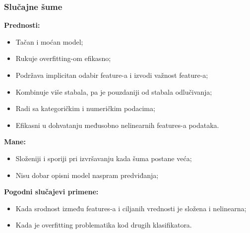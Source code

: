\documentclass[fontsize=12bp, paper=a4]{scrarticle}
\begin{document}
\subsubsection{Slučajne šume}
\textbf{Prednosti:}
\begin{itemize}
    \item Tačan i moćan model;
    \item Rukuje overfitting-om efikasno;
    \item Podržava implicitan odabir feature-a i izvodi važnost feature-a;
    \item Kombinuje više stabala, pa je pouzdaniji od stabala odlučivanja;
    \item Radi sa kategoričkim i numeričkim podacima;
    \item Efikasni u dohvatanju međusobno nelinearnih features-a podataka.
\end{itemize}

\textbf{Mane:}
\begin{itemize}
    \item Složeniji i sporiji pri izvršavanju kada šuma postane veća;
    \item Nisu dobar opisni model naspram predviđanja;
\end{itemize}





\textbf{Pogodni slučajevi primene:}
\begin{itemize}
    \item Kada srodnost između features-a i ciljanih vrednosti je složena i nelinearna;
    \item Kada je overfitting problematika kod drugih klasifikatora.
\end{itemize}
\end{document}

